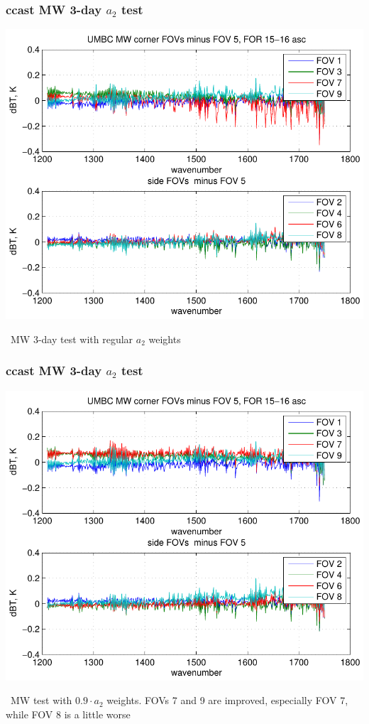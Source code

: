 \documentclass[11pt]{beamer}
\begin{document}
\begin{frame}
\frametitle{ccast MW 3-day $a_2$ test}

\begin{center}
  \includegraphics[scale=0.6]{umbc_MW_dif_1-3_Mar.pdf}
\end{center}

\ccast\ MW 3-day test with regular $a_2$ weights

\end{frame}
\begin{frame}
\frametitle{ccast MW 3-day $a_2$ test}

\begin{center}
  \includegraphics[scale=0.6]{umbc_MW_9a2_1-3_Mar.pdf}
\end{center}

\ccast\ MW test with $0.9 \cdot a_2$ weights.  FOVs 7 and 9 are
improved, especially FOV 7, while FOV 8 is a little worse

\end{frame}
\end{document}
